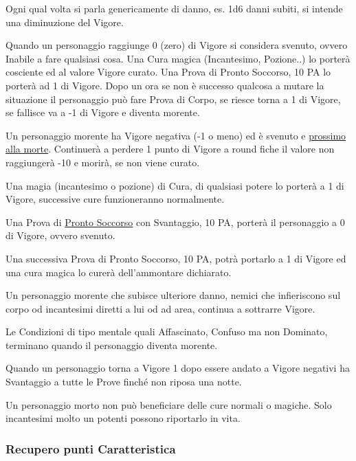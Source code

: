 \documentclass[12pt,a4paper,twoside,openany]{book}
\begin{document}
\begin{multicols}{2}

Ogni qual volta si parla genericamente di danno, es. 1d6 danni subiti, si intende una diminuzione del Vigore.

Quando un personaggio raggiunge 0 (zero) di Vigore si considera svenuto, ovvero Inabile a fare qualsiasi cosa. Una Cura magica (Incantesimo, Pozione..) lo porterà cosciente ed al valore Vigore curato. Una Prova di Pronto Soccorso, 10 PA lo porterà ad 1 di Vigore. Dopo un ora se non è successo qualcosa a mutare la situazione il personaggio può fare Prova di Corpo, se riesce torna a 1 di Vigore, se fallisce va a -1 di Vigore e diventa morente.

Un personaggio morente ha Vigore negativa (-1 o meno) ed è svenuto e \hyperlink{morente}{prossimo alla morte}. Continuerà a perdere 1 punto di Vigore a round fiche il valore non raggiungerà -10 e morirà, se non viene curato.

Una magia (incantesimo o pozione) di Cura, di qualsiasi potere lo porterà a 1 di Vigore, successive cure funzioneranno normalmente.

Una Prova di \hyperlink{prontosoccorso}{Pronto Soccorso} con Svantaggio, 10 PA, porterà il personaggio a 0 di Vigore, ovvero svenuto. 

Una successiva Prova di Pronto Soccorso, 10 PA, potrà portarlo a 1 di Vigore ed una cura magica lo curerà dell'ammontare dichiarato.

Un personaggio morente che subisce ulteriore danno, nemici che infieriscono sul corpo od incantesimi diretti a lui od ad area, continua a sottrarre Vigore. 

Le Condizioni di tipo mentale quali Affascinato, Confuso ma non Dominato, terminano quando il personaggio diventa morente.

Quando un personaggio torna a Vigore 1 dopo essere andato a Vigore negativi ha Svantaggio a tutte le Prove finché non riposa una notte.

Un personaggio morto non può beneficiare delle cure normali o magiche. Solo incantesimi molto un potenti possono riportarlo in vita.

\subsubsection{Recupero punti Caratteristica}\label{recuperopunticcaratteristica}


\end{multicols}
\end{document}

